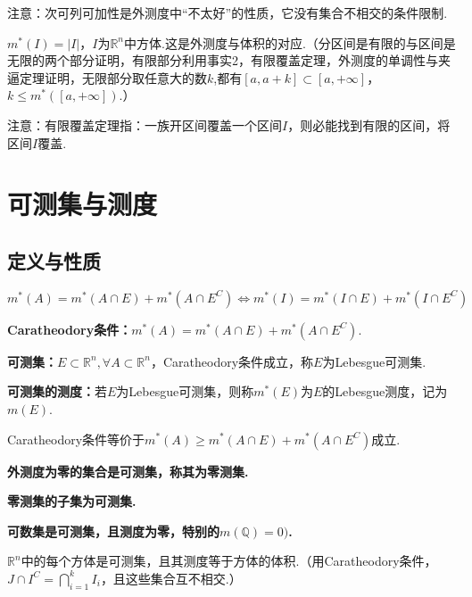 \documentclass[bwprint, withoutpreface]{cumcmthesis}
\begin{document}
注意：次可列可加性是外测度中“不太好”的性质，它没有集合不相交的条件限制.

$m^*(I) = |I|$，$I$为$\mathbb{R}^n$中方体.这是外测度与体积的对应.（分区间是有限的与区间是无限的两个部分证明，有限部分利用事实2，有限覆盖定理，外测度的单调性与夹逼定理证明，无限部分取任意大的数$k$,都有$[a, a + k] \subset [a, +\infty]$，$k \leqslant m^*([a, +\infty])$.）

注意：有限覆盖定理指：一族开区间覆盖一个区间$I$，则必能找到有限的区间，将区间$I$覆盖.

\section{可测集与测度}
\subsection{定义与性质}

\indent $m^*(A) = m^*(A \cap E) + m^*(A \cap E^C) \Leftrightarrow m^*(I) = m^*(I \cap E) + m^*(I \cap E^C)$

\textbf{Caratheodory条件：}$m^*(A) = m^*(A \cap E) + m^*(A \cap E^C)$.

\textbf{可测集：}$E \subset \mathbb{R}^n, \forall A \subset \mathbb{R}^n$，Caratheodory条件成立，称$E$为Lebesgue可测集.

\textbf{可测集的测度：}若$E$为Lebesgue可测集，则称$m^*(E)$为$E$的Lebesgue测度，记为$m(E)$.

Caratheodory条件等价于$m^*(A) \geqslant m^*(A \cap E) + m^*(A \cap E^C)$成立.

\textbf{外测度为零的集合是可测集，称其为零测集.}

\textbf{零测集的子集为可测集.}

\textbf{可数集是可测集，且测度为零，特别的$m(\mathbb{Q}) =0 )$.}

$\mathbb{R}^n$中的每个方体是可测集，且其测度等于方体的体积.（用Caratheodory条件，$J \cap {I^C} = \bigcap_{i = 1}^{k}{I_i}$，且这些集合互不相交.）
\end{document}
